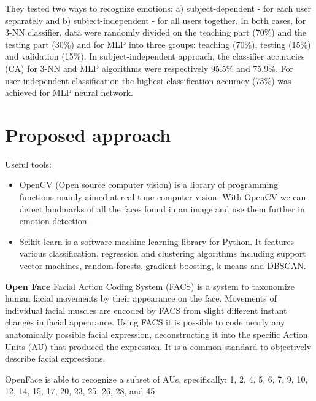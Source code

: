 \documentclass[runningheads,a4paper,11pt]{report}
\begin{document}
They tested two ways to recognize emotions: a) subject-dependent - for each user separately and b) subject-independent - for all users together. In both cases, for 3-NN classifier, data were randomly divided on the teaching part (70\%) and the testing part (30\%) and for MLP into three groups: teaching (70\%), testing (15\%) and validation (15\%).
In subject-independent approach, the classifier accuracies (CA) for 3-NN and MLP algorithms were respectively 95.5\% and 75.9\%.
For user-independent classification the highest classification accuracy (73\%) was achieved for MLP neural network. \cite{Tarnowski17}




\chapter{Proposed approach}
\label{chapter:proposedApproach}

Useful tools: 
\begin{itemize}
\item OpenCV (Open source computer vision) is a library of programming functions mainly aimed at real-time computer vision. With OpenCV we can detect landmarks of all the faces found in an image and use them further in emotion detection.
\item Scikit-learn is a software machine learning library for Python. It features various classification, regression and clustering algorithms including support vector machines, random forests, gradient boosting, k-means and DBSCAN.
\end{itemize}

\textbf{Open Face}
Facial Action Coding System (FACS) is a system to taxonomize human facial movements by their appearance on the face. Movements of individual facial muscles are encoded by FACS from slight different instant changes in facial appearance. Using FACS it is possible to code nearly any anatomically possible facial expression, deconstructing it into the specific Action Units (AU) that produced the expression. It is a common standard to objectively describe facial expressions.

OpenFace is able to recognize a subset of AUs, specifically: 1, 2, 4, 5, 6, 7, 9, 10, 12, 14, 15, 17, 20, 23, 25, 26, 28, and 45. \cite{Baltrusaitis18}


\end{document}

